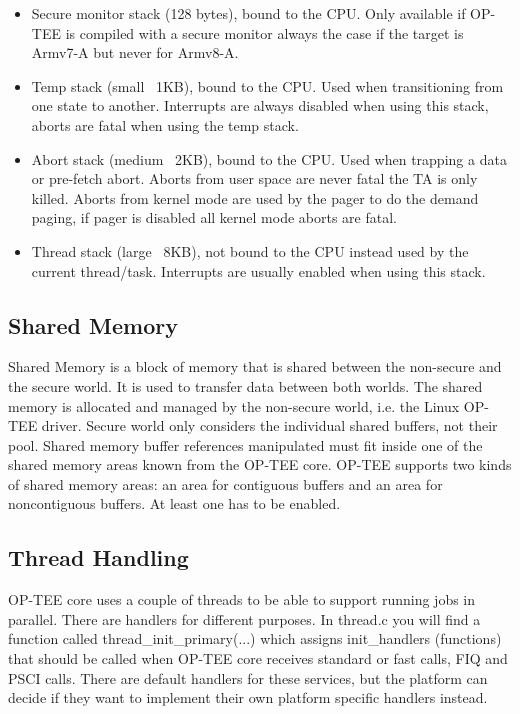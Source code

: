 \documentclass{article}
\begin{document}
\begin{itemize}
\item Secure monitor stack (128 bytes), bound to the CPU. Only available if OP-TEE is compiled with a secure monitor always the case if the target is Armv7-A but never for Armv8-A.
\item Temp stack (small ~1KB), bound to the CPU. Used when transitioning from one state to another. Interrupts are always disabled when using this stack, aborts are fatal when using the temp stack.
\item Abort stack (medium ~2KB), bound to the CPU. Used when trapping a data or pre-fetch abort. Aborts from user space are never fatal the TA is only killed. Aborts from kernel mode are used by the pager to do the demand paging, if pager is disabled all kernel mode aborts are fatal.
\item Thread stack (large ~8KB), not bound to the CPU instead used by the current thread/task. Interrupts are usually enabled when using this stack.
\end{itemize}

\subsection{Shared Memory}

Shared Memory is a block of memory that is shared between the non-secure and the secure world. It is used to transfer data between both worlds. The shared memory is allocated and managed by the non-secure world, i.e. the Linux OP-TEE driver. Secure world only considers the individual shared buffers, not their pool. Shared memory buffer references manipulated must fit inside one of the shared memory areas known from the OP-TEE core. OP-TEE supports two kinds of shared memory areas: an area for contiguous buffers and an area for noncontiguous buffers. At least one has to be enabled.

\subsection{Thread Handling}

OP-TEE core uses a couple of threads to be able to support running jobs in parallel. There are handlers for different purposes. In thread.c you will find a function called thread\_init\_primary(...) which assigns init\_handlers (functions) that should be called when OP-TEE core receives standard or fast calls, FIQ and PSCI calls. There are default handlers for these services, but the platform can decide if they want to implement their own platform specific handlers instead.
\end{document}
